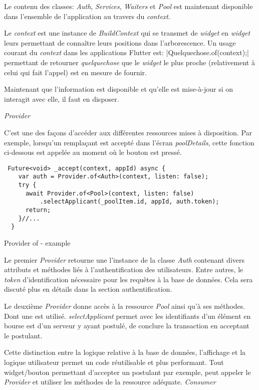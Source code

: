 Le contenu des classes: \textit{Auth}, \textit{Services}, \textit{Waiters} et \textit{Pool} est maintenant disponible dans l'ensemble de l'application au travers du \textit{context}.

Le \textit{context} est une instance de \textit{BuildContext} qui se transmet de \textit{widget} en \textit{widget} leurs permettant de connaître leurs positions dans l'arborescence. Un usage courant du \textit{context} dans les applications Flutter est: |Quelquechose.of(context);| permettant de retourner \textit{quelquechose} que le \textit{widget} le plus proche (relativement à celui qui fait l'appel) est en mesure de fournir.

Maintenant que l'information est disponible et qu'elle est mise-à-jour si on interagit avec elle, il faut en disposer. 

\emph{Provider}

C'est une des façons d'accéder aux différentes ressources mises à disposition. Par exemple, lorsqu'un remplaçant est accepté dans l'écran \textit{poolDetails}, cette fonction ci-dessous est appelée au moment où le bouton est pressé.

\begin{listing}[!h]
\begin{verbatim}
 Future<void> _accept(context, appId) async {
    var auth = Provider.of<Auth>(context, listen: false);
    try {
      await Provider.of<Pool>(context, listen: false)
          .selectApplicant(_poolItem.id, appId, auth.token);
      return;
    }//...
  }
\end{verbatim}
\caption{Provider of - example}
\label{code:providerOf}
\end{listing}

Le premier \textit{Provider} retourne une l'instance de la classe \textit{Auth} contenant divers attributs et méthodes liés à l'authentification des utilisateurs. Entre autres, le \textit{token} d'identification nécessaire pour les requêtes à la base de données. Cela sera discuté plus en détails dans la section authentification. 

Le deuxième \textit{Provider} donne accès à la ressource \textit{Pool} ainsi qu'à ses méthodes. Dont une est utilisé. \textit{selectApplicant} permet avec les identifiants d'un élément en bourse est d'un serveur y ayant postulé, de conclure la transaction en acceptant le postulant. 

Cette distinction entre la logique relative à la base de données, l'affichage et la logique utilisateur permet un code réutilisable et plus performant. Tout widget/bouton permettant d'accepter un postulant par exemple, peut appeler le \textit{Provider} et utiliser les méthodes de la ressource adéquate.
\newpage
\emph{Consumer}

